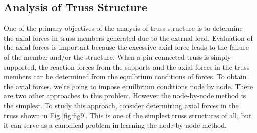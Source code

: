 \documentclass[10pt,a4j]{article}
\begin{document}
\subsection{Analysis of Truss Structure}
One of the primary objectives of the analysis of truss structure is to determine 
the axial forces in truss members generated due to  the extrnal load. 
Evaluation of the axial forces is important because the excessive axial force leads to the 
failure of the member and/or the structure.
When a pin-connected truss is simply supported, the reaction forces from the supports and the 
axial forces in the truss members can be determined from the equilbrium conditions of forces. 
To obtain the axial forces, we're going to impose equilbrium conditions node by node.   
There are two other approaches to this problem. However the node-by-node method is the simplest. 
To study this approach, consider determining axial forces in the truss shown in 
Fig.\ref{fig:fig9}. This is one of the simplest truss structures of all, but it can serve as a 
canonical problem in learning the node-by-node method.\\ 
\end{document}
